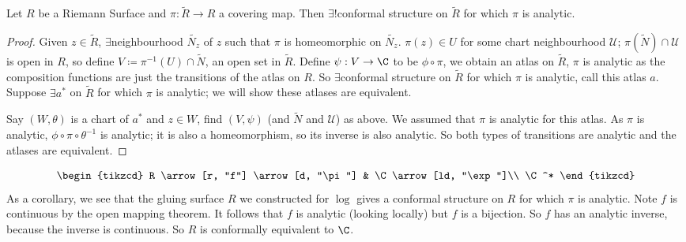 \documentclass{article}
\begin{document}
\begin{prop}
    Let $R$ be a Riemann Surface and $\pi: \widetilde{R} \to R$ a covering map. Then $\exists!$conformal structure on $\widetilde{R}$ for which $\pi$ is analytic.
\end{prop}

\begin{proof}
    Given $z \in \widetilde{R}$, $\exists$neighbourhood $\widetilde{N_z}$ of $z$ such that $\pi$ is homeomorphic on $\widetilde{N_z}$.
    $\pi(z) \in U$ for some chart neighbourhood $\mathcal{U}$; $\pi(\widetilde{N}) \cap \mathcal{U}$ is open in $R$, so define $V \coloneqq \pi^{-1}(U) \cap \widetilde{N}$, an open set in $\widetilde{R}$.
    Define $\psi: V \to \C$ to be $\phi \circ \pi$, we obtain an atlas on $\widetilde{R}$, $\pi$ is analytic as the composition functions are just the transitions of the atlas on $R$.
    So $\exists$conformal structure on $\widetilde{R}$ for which $\pi$ is analytic, call this atlas $a$.
    Suppose $\exists a^*$ on $\widetilde{R}$ for which $\pi$ is analytic; we will show these atlases are equivalent.

    Say $(W, \theta)$ is a chart of $a^*$ and $z \in W$, find $(V, \psi)$ (and $\widetilde{N}$ and $\mathcal{U}$) as above.
    We assumed that $\pi$ is analytic for this atlas. As $\pi$ is analytic, $\phi \circ \pi \circ \theta^{-1}$ is analytic; it is also a homeomorphism, so its inverse is also analytic.
    So both types of transitions are analytic and the atlases are equivalent.
\end{proof}

\begin{equation*}
    \begin{tikzcd}
        R \arrow[r, "f"] \arrow[d, "\pi"] & \C \arrow[ld, "\exp"]\\
        \C^*
    \end{tikzcd}
\end{equation*}
As a corollary, we see that the gluing surface $R$ we constructed for $\log$ gives a conformal structure on $R$ for which $\pi$ is analytic.
Note $f$ is continuous by the open mapping theorem. It follows that $f$ is analytic (looking locally) but $f$ is a bijection. So $f$ has an analytic inverse, because the inverse is continuous. So $R$ is conformally equivalent to $\C$.
\end{document}
